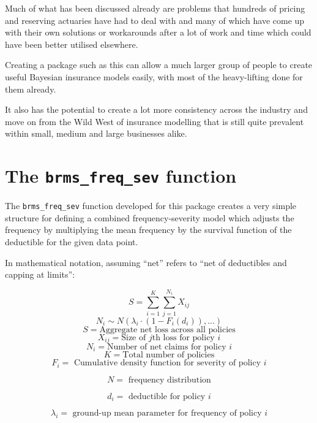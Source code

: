 \documentclass[
]{book}
\begin{document}
Much of what has been discussed already are problems that hundreds of pricing and reserving actuaries have had to deal with and many of which have come up with their own solutions or workarounds after a lot of work and time which could have been better utilised elsewhere.

Creating a package such as this can allow a much larger group of people to create useful Bayesian insurance models easily, with most of the heavy-lifting done for them already.

It also has the potential to create a lot more consistency across the industry and move on from the Wild West of insurance modelling that is still quite prevalent within small, medium and large businesses alike.

\hypertarget{the-brms_freq_sev-function}{%
\section{\texorpdfstring{The \texttt{brms\_freq\_sev} function}{The brms\_freq\_sev function}}\label{the-brms_freq_sev-function}}

The \texttt{brms\_freq\_sev} function developed for this package creates a very simple structure for defining a combined frequency-severity model which adjusts the frequency by multiplying the mean frequency by the survival function of the deductible for the given data point.

In mathematical notation, assuming ``net'' refers to ``net of deductibles and capping at limits'':

\[S = \sum_{i=1}^K\sum_{j=1}^{N_i}X_{ij}\]
\[N_i \sim N(\lambda_i \cdot (1-F_i(d_i)), ...)\]
\[S = \mbox{Aggregate net loss across all policies}\]
\[X_{ij} = \mbox{Size of } j \mbox{th loss for policy } i\]
\[N_i = \mbox{Number of net claims for policy } i\]
\[K = \mbox{Total number of policies}\]
\[F_{i} = \mbox{ Cumulative density function for severity of policy } i\]

\[N = \mbox{ frequency distribution}\]

\[d_i = \mbox{ deductible for policy } i\]

\[\lambda_i = \mbox{ ground-up mean parameter for frequency of policy } i\]

  
\end{document}

